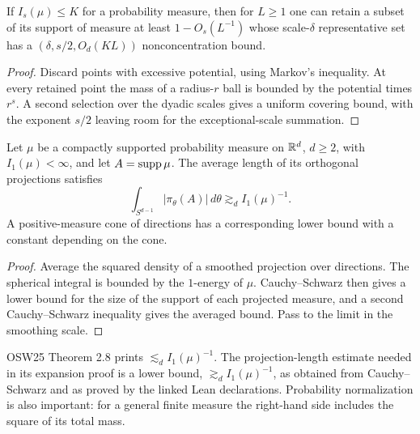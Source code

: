 \begin{lemma}
\label{lem:energy-frostman}
If $I_s(\mu)\leq K$ for a probability measure, then for $L\geq1$
one can retain a subset of its support of measure at least
$1-O_s(L^{-1})$ whose scale-$\delta$ representative set has a
$(\delta,s/2,O_d(KL))$ nonconcentration bound.
\end{lemma}
\begin{proof}
Discard points with excessive potential, using Markov's inequality.
At every retained point the mass of a radius-$r$ ball is bounded by
the potential times $r^s$. A second selection over the dyadic scales
gives a uniform covering bound, with the exponent $s/2$ leaving room
for the exceptional-scale summation.
\end{proof}

\begin{theorem}
\label{thm:marstrand-energy}
Let $\mu$ be a compactly supported probability measure on $\mathbb{R}^d$,
$d\geq2$, with $I_1(\mu)<\infty$, and let $A=\operatorname{supp}\mu$.
The average length of its orthogonal projections satisfies
\[
       \int_{S^{d-1}}|\pi_\theta(A)|\,d\theta
                                  \gtrsim_d I_1(\mu)^{-1}.
\]
A positive-measure cone of directions has a corresponding lower
bound with a constant depending on the cone.
\end{theorem}
\begin{proof}
Average the squared density of a smoothed projection over directions.
The spherical integral is bounded by the $1$-energy of $\mu$.
Cauchy--Schwarz then gives a lower bound for the size of the support
of each projected measure, and a second Cauchy--Schwarz inequality
gives the averaged bound. Pass to the limit in the smoothing scale.
\end{proof}

\begin{remark}
\label{rem:marstrand-sign}
OSW25 Theorem 2.8 prints $\lesssim_d I_1(\mu)^{-1}$.
The projection-length estimate needed in its expansion proof is a
lower bound, $\gtrsim_d I_1(\mu)^{-1}$, as obtained from
Cauchy--Schwarz and as proved by the linked Lean declarations.
Probability normalization is also important: for a general finite
measure the right-hand side includes the square of its total mass.
\end{remark}

